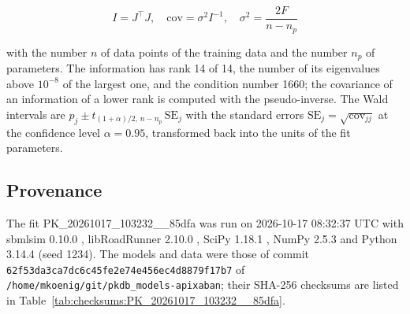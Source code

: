 \documentclass{article}
\begin{document}
\begin{equation}
I = J^\top J, \quad \mathrm{cov} = \sigma^2 I^{-1}, \quad \sigma^2 = \frac{2 F}{n - n_p}
\end{equation}

with the number $n$ of data points of the training data and the number $n_p$ of parameters. The information has rank 14 of 14, the number of its eigenvalues above $10^{-8}$ of the largest one, and the condition number 1660; the covariance of an information of a lower rank is computed with the pseudo-inverse. The Wald intervals are $\hat{p}_j \pm t_{(1+\alpha)/2,\, n-n_p}\, \mathrm{SE}_j$ with the standard errors $\mathrm{SE}_j = \sqrt{\mathrm{cov}_{jj}}$ at the confidence level $\alpha = 0.95$, transformed back into the units of the fit parameters.

\subsection{Provenance}

The fit PK\_20261017\_103232\_\_85dfa was run on 2026-10-17 08:32:37 UTC with sbmlsim 0.10.0 \cite{Koenig2026_sbmlsim}, libRoadRunner 2.10.0 \cite{Welsh2023}, SciPy 1.18.1 \cite{Virtanen2020}, NumPy 2.5.3 \cite{Harris2020} and Python 3.14.4 (seed 1234). The models and data were those of commit \texttt{62f53da3ca7dc6c45fe2e74e456ec4d8879f17b7} of \texttt{/home/mkoenig/git/pkdb\_models-apixaban}; their SHA-256 checksums are listed in Table~\ref{tab:checksums:PK_20261017_103232__85dfa}.
\end{document}
